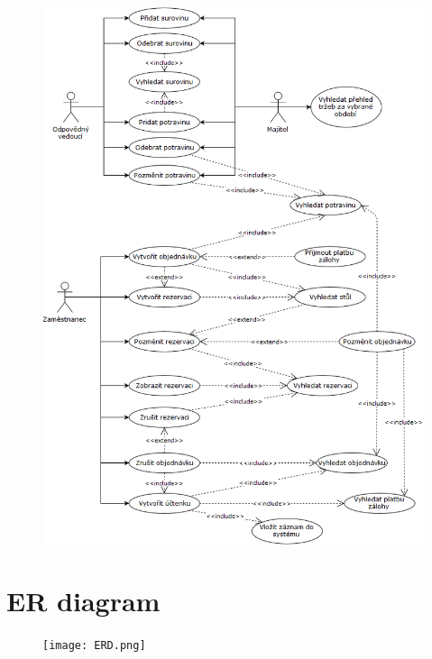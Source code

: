 \documentclass[11pt, a4paper]{article}[]
\begin{document}
	\begin{figure}[h]
	\begin{center} 
		\includegraphics[width=15cm]{use-case.png} 
		\label{fig:obr_use-case}
	\end{center}
	\end{figure}

	\pagebreak  %

	
	\section{ER diagram}

	\begin{figure}[h]
	\begin{center} 
		\texttt{[image: ERD.png]} 
		\label{fig:obr_ERD}
	\end{center}
	\end{figure}

	
\end{document}
